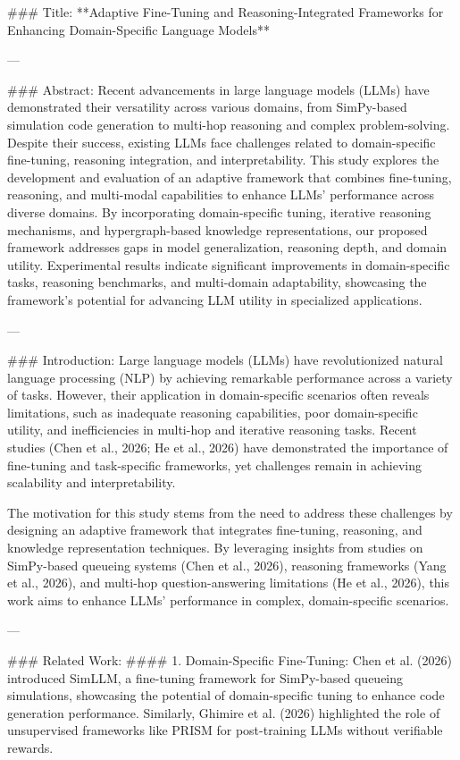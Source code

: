 ### Title:
**Adaptive Fine-Tuning and Reasoning-Integrated Frameworks for Enhancing Domain-Specific Language Models**

---

### Abstract:
Recent advancements in large language models (LLMs) have demonstrated their versatility across various domains, from SimPy-based simulation code generation to multi-hop reasoning and complex problem-solving. Despite their success, existing LLMs face challenges related to domain-specific fine-tuning, reasoning integration, and interpretability. This study explores the development and evaluation of an adaptive framework that combines fine-tuning, reasoning, and multi-modal capabilities to enhance LLMs' performance across diverse domains. By incorporating domain-specific tuning, iterative reasoning mechanisms, and hypergraph-based knowledge representations, our proposed framework addresses gaps in model generalization, reasoning depth, and domain utility. Experimental results indicate significant improvements in domain-specific tasks, reasoning benchmarks, and multi-domain adaptability, showcasing the framework's potential for advancing LLM utility in specialized applications.

---

### Introduction:
Large language models (LLMs) have revolutionized natural language processing (NLP) by achieving remarkable performance across a variety of tasks. However, their application in domain-specific scenarios often reveals limitations, such as inadequate reasoning capabilities, poor domain-specific utility, and inefficiencies in multi-hop and iterative reasoning tasks. Recent studies (Chen et al., 2026; He et al., 2026) have demonstrated the importance of fine-tuning and task-specific frameworks, yet challenges remain in achieving scalability and interpretability.

The motivation for this study stems from the need to address these challenges by designing an adaptive framework that integrates fine-tuning, reasoning, and knowledge representation techniques. By leveraging insights from studies on SimPy-based queueing systems (Chen et al., 2026), reasoning frameworks (Yang et al., 2026), and multi-hop question-answering limitations (He et al., 2026), this work aims to enhance LLMs' performance in complex, domain-specific scenarios.

---

### Related Work:
#### 1. Domain-Specific Fine-Tuning:
Chen et al. (2026) introduced SimLLM, a fine-tuning framework for SimPy-based queueing simulations, showcasing the potential of domain-specific tuning to enhance code generation performance. Similarly, Ghimire et al. (2026) highlighted the role of unsupervised frameworks like PRISM for post-training LLMs without verifiable rewards.

